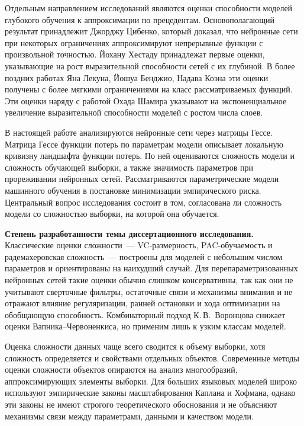 \documentclass{dissert}
\newcommand{\paragraph}[1]{\noindent\textbf{#1}\quad}
\begin{document}
Отдельным направлением исследований являются оценки способности моделей глубокого обучения к аппроксимации по прецедентам.
Основополагающий результат принадлежит Джорджу Цибенко, который доказал, что нейронные сети при некоторых ограничениях аппроксимируют непрерывные функции с произвольной точностью.
Йохану Хестаду принадлежат первые оценки, указывающие на рост выразительной способности сетей с их глубиной.
В более поздних работах Яна Лекуна, Йошуа Бенджио, Надава Коэна эти оценки получены с более мягкими ограничениями на класс рассматриваемых функций.
Эти оценки наряду с работой Охада Шамира указывают на экспоненциальное увеличение выразительной способности моделей с ростом числа слоев.

В настоящей работе анализируются нейронные сети через матрицы Гессе.
Матрица Гессе функции потерь по параметрам модели описывает локальную кривизну ландшафта функции потерь.
По ней оцениваются сложность модели и сложность обучающей выборки, а также значимость параметров при прореживании нейронных сетей.
Рассматриваются параметрические модели машинного обучения в постановке минимизации эмпирического риска.
Центральный вопрос исследования состоит в том, согласована ли сложность модели со сложностью выборки, на которой она обучается.

\paragraph{Степень разработанности темы диссертационного исследования.}
Классические оценки сложности~--- VC-размерность, PAC-обучаемость и радемахеровская сложность~--- построены для моделей с небольшим числом параметров и ориентированы на наихудший случай.
Для перепараметризованных нейронных сетей такие оценки обычно слишком консервативны, так как они не учитывают сверточные фильтры, остаточные связи и механизмы внимания и не отражают влияние регуляризации, ранней остановки и хода оптимизации на обобщающую способность.
Комбинаторный подход К.\,В.~Воронцова снижает оценки Вапника--Червоненкиса, но применим лишь к узким классам моделей.

Оценка сложности данных чаще всего сводится к объему выборки, хотя сложность определяется и свойствами отдельных объектов.
Современные методы оценки сложности объектов опираются на анализ многообразий, аппроксимирующих элементы выборки.
Для больших языковых моделей широко используют эмпирические законы масштабирования Каплана и Хофмана, однако эти законы не имеют строгого теоретического обоснования и не объясняют механизмы связи между параметрами, данными и качеством модели.
\end{document}
